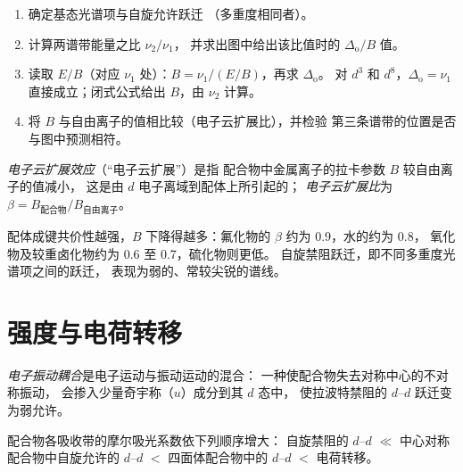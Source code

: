 \begin{method}\label{met:b3:complex-spectra-magnetism:read-ts}
\begin{enumerate}
  \item 确定基态光谱项与自旋允许跃迁
        （多重度相同者）。
  \item 计算两谱带能量之比 $\nu_2/\nu_1$，
        并求出图中给出该比值时的 $\Delta_{\mathrm o}/B$ 值。
  \item 读取 $E/B$（对应 $\nu_1$ 处）：$B = \nu_1/(E/B)$，再求 $\Delta_{\mathrm o}$。
        对 $d^3$ 和 $d^8$，$\Delta_{\mathrm o} = \nu_1$ 直接成立；闭式公式给出 $B$，由 $\nu_2$ 计算。
  \item 将 $B$ 与自由离子的值相比较（电子云扩展比），并检验
        第三条谱带的位置是否与图中预测相符。
\end{enumerate}
\end{method}

\begin{definition}[电子云扩展效应]\label{def:b3:complex-spectra-magnetism:nephelauxetic}
\emph{电子云扩展效应}（“电子云扩展”）是指
配合物中金属离子的拉卡参数 $B$ 较自由离子的值减小，
这是由 $d$ 电子离域到配体上所引起的；
\emph{电子云扩展比}为 $\beta =
B_{\text{配合物}}/B_{\text{自由离子}}$。
\end{definition}

配体成键共价性越强，$B$ 下降得越多：氟化物的 $\beta$ 约为 0.9，水的约为 0.8，
氧化物及较重卤化物约为 0.6 至 0.7，硫化物则更低。
自旋禁阻跃迁，即不同多重度光谱项之间的跃迁，
表现为弱的、常较尖锐的谱线。

\section{强度与电荷转移}

\begin{definition}[电子振动耦合]\label{def:b3:complex-spectra-magnetism:vibronic-coupling}
\emph{电子振动耦合}是电子运动与振动运动的混合：
一种使配合物失去对称中心的不对称振动，
会掺入少量奇宇称（$u$）成分到其 $d$ 态中，
使拉波特禁阻的 $d$--$d$ 跃迁变为弱允许。
\end{definition}

\begin{proposition}[吸收带的强度]\label{prop:b3:complex-spectra-magnetism:intensity-order}
配合物各吸收带的摩尔吸光系数依下列顺序增大：
自旋禁阻的 $d$--$d$ $\ll$ 中心对称配合物中自旋允许的 $d$--$d$ $<$
四面体配合物中的 $d$--$d$ $<$ 电荷转移。
\end{proposition}

